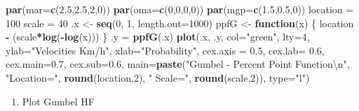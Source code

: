 \documentclass[12pt,oneside]{reedthesis}
\newenvironment{Shaded}{\begin{snugshade}}{\end{snugshade}}
\newcommand{\CharTok}[1]{\textcolor[rgb]{0.31,0.60,0.02}{#1}}
\newcommand{\ControlFlowTok}[1]{\textcolor[rgb]{0.13,0.29,0.53}{\textbf{#1}}}
\newcommand{\DataTypeTok}[1]{\textcolor[rgb]{0.13,0.29,0.53}{#1}}
\newcommand{\DecValTok}[1]{\textcolor[rgb]{0.00,0.00,0.81}{#1}}
\newcommand{\FloatTok}[1]{\textcolor[rgb]{0.00,0.00,0.81}{#1}}
\newcommand{\KeywordTok}[1]{\textcolor[rgb]{0.13,0.29,0.53}{\textbf{#1}}}
\newcommand{\NormalTok}[1]{#1}
\newcommand{\OperatorTok}[1]{\textcolor[rgb]{0.81,0.36,0.00}{\textbf{#1}}}
\newcommand{\StringTok}[1]{\textcolor[rgb]{0.31,0.60,0.02}{#1}}
\providecommand{\tightlist}{%
  \setlength{\itemsep}{0pt}\setlength{\parskip}{0pt}}
\begin{document}
\vspace{0.4cm}
\begin{Shaded}
\begin{Highlighting}[]
\KeywordTok{par}\NormalTok{(}\DataTypeTok{mar=}\KeywordTok{c}\NormalTok{(}\FloatTok{2.5}\NormalTok{,}\FloatTok{2.5}\NormalTok{,}\DecValTok{2}\NormalTok{,}\DecValTok{0}\NormalTok{))}
\KeywordTok{par}\NormalTok{(}\DataTypeTok{oma=}\KeywordTok{c}\NormalTok{(}\DecValTok{0}\NormalTok{,}\DecValTok{0}\NormalTok{,}\DecValTok{0}\NormalTok{,}\DecValTok{0}\NormalTok{))}
\KeywordTok{par}\NormalTok{(}\DataTypeTok{mgp=}\KeywordTok{c}\NormalTok{(}\FloatTok{1.5}\NormalTok{,}\FloatTok{0.5}\NormalTok{,}\DecValTok{0}\NormalTok{))}
\NormalTok{location =}\StringTok{ }\DecValTok{100}
\NormalTok{scale =}\StringTok{ }\DecValTok{40}
\NormalTok{.x <-}\StringTok{ }\KeywordTok{seq}\NormalTok{(}\DecValTok{0}\NormalTok{, }\DecValTok{1}\NormalTok{, }\DataTypeTok{length.out=}\DecValTok{1000}\NormalTok{)}
\NormalTok{ppfG <-}\StringTok{ }\ControlFlowTok{function}\NormalTok{(x) \{}
\NormalTok{  location }\OperatorTok{-}\StringTok{ }\NormalTok{(scale}\OperatorTok{*}\KeywordTok{log}\NormalTok{(}\OperatorTok{-}\KeywordTok{log}\NormalTok{(x)))}
\NormalTok{  \}}
\NormalTok{.y =}\StringTok{ }\KeywordTok{ppfG}\NormalTok{(.x)}
\KeywordTok{plot}\NormalTok{(.x, .y, }\DataTypeTok{col=}\StringTok{"green"}\NormalTok{, }\DataTypeTok{lty=}\DecValTok{4}\NormalTok{, }\DataTypeTok{ylab=}\StringTok{"Velocities Km/h"}\NormalTok{, }\DataTypeTok{xlab=}\StringTok{"Probability"}\NormalTok{, }\DataTypeTok{cex.axis =} \FloatTok{0.5}\NormalTok{, }\DataTypeTok{cex.lab=} \FloatTok{0.6}\NormalTok{, }\DataTypeTok{cex.main=}\FloatTok{0.7}\NormalTok{, }\DataTypeTok{cex.sub=}\FloatTok{0.6}\NormalTok{,}
 \DataTypeTok{main=}\KeywordTok{paste}\NormalTok{(}\StringTok{"Gumbel - Percent Point Function}\CharTok{\textbackslash{}n}\StringTok{"}\NormalTok{, }\StringTok{"Location="}\NormalTok{, }\KeywordTok{round}\NormalTok{(location,}\DecValTok{2}\NormalTok{), }\StringTok{" Scale="}\NormalTok{, }\KeywordTok{round}\NormalTok{(scale,}\DecValTok{2}\NormalTok{)), }\DataTypeTok{type=}\StringTok{"l"}\NormalTok{)}
\end{Highlighting}
\end{Shaded}
\normalsize
\begin{enumerate}
\def\labelenumi{\arabic{enumi}.}
\setcounter{enumi}{4}
\tightlist
\item
  Plot Gumbel HF
\end{enumerate}
\tiny
\end{document}
